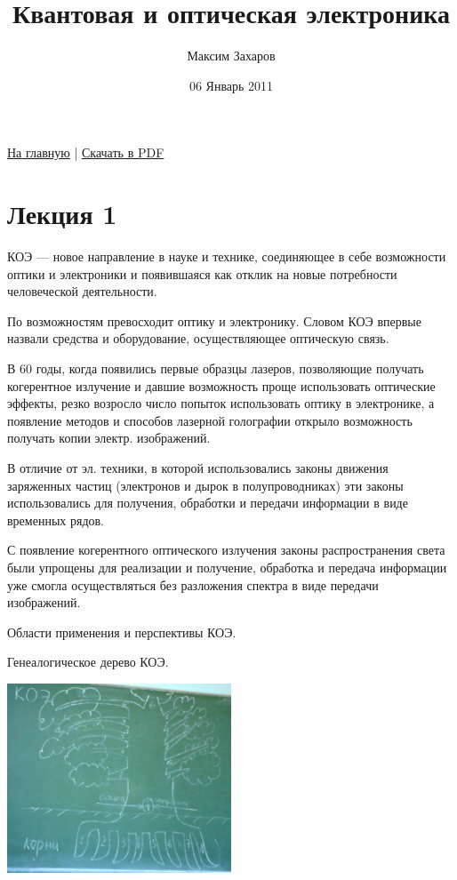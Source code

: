\documentclass[12pt, russian, oneside, article]{ncc}
\begin{document}
\title{Квантовая и оптическая электроника}
\author{Максим Захаров}
\date{06 Январь 2011}
\maketitle

\setcounter{tocdepth}{3}
\tableofcontents
\vspace*{1cm}


\href{file:///home/maxim/Documents/Git/lectures/index.org}{На главную} | \href{file:///home/maxim/Documents/Git/lectures/other/KOE_Lectures.pdf}{Скачать в PDF}

\section{Лекция 1}
\label{sec-1}


КОЭ --- новое направление в науке и технике, соединяющее в себе возможности оптики и электроники и появившаяся как отклик на новые потребности человеческой деятельности.

По возможностям превосходит оптику и электронику. Словом КОЭ впервые назвали средства и оборудование, осуществляющее оптическую связь.

В 60 годы, когда появились первые образцы лазеров, позволяющие получать когерентное излучение и давшие возможность проще использовать оптические эффекты, резко возросло число попыток использовать оптику в электронике, а появление методов и способов лазерной голографии открыло возможность получать копии электр. изображений.

В отличие от эл. техники, в которой использовались законы движения заряженных частиц (электронов и дырок в полупроводниках) эти законы использовались для получения, обработки и передачи информации в виде временных рядов.

С появление когерентного оптического излучения законы распространения света были упрощены для реализации и получение, обработка и передача информации уже смогла осуществляться без разложения спектра в виде передачи изображений.

Области применения и перспективы КОЭ. 

Генеалогическое дерево КОЭ.

\includegraphics[width=0.5\textwidth]{images/KOE/tree.png}
\end{document}
